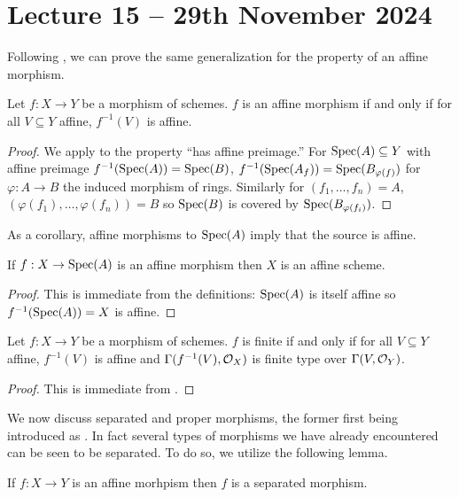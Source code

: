 \section{Lecture 15 -- 29th November 2024}\label{sec: lecture 15}
Following , we can prove the same generalization for the property of an affine morphism. 
\begin{proposition}\label{prop: affine communication for affine}
    Let $f:X\to Y$ be a morphism of schemes. $f$ is an affine morphism if and only if for all $V\subseteq Y$ affine, $f^{-1}(V)$ is affine. 
\end{proposition}
\begin{proof}
    We apply  to the property ``has affine preimage.'' For $\operatorname{Spec}(A)\subseteq Y$ with affine preimage $f^{-1}(\operatorname{Spec}(A))=\operatorname{Spec}(B)$, $f^{-1}(\operatorname{Spec}(A_{f}))=\operatorname{Spec}(B_{\varphi(f)})$ for $\varphi:A\to B$ the induced morphism of rings. Similarly for $(f_{1},\dots,f_{n})=A$, $(\varphi(f_{1}),\dots,\varphi(f_{n}))=B$ so $\operatorname{Spec}(B)$ is covered by $\operatorname{Spec}(B_{\varphi(f_{i})})$. 
\end{proof}
As a corollary, affine morphisms to $\operatorname{Spec}(A)$ imply that the source is affine. 
\begin{corollary}\label{corr: affine morphism to affine target is affine source}
    If $f:X\to \operatorname{Spec}(A)$ is an affine morphism then $X$ is an affine scheme.  
\end{corollary}
\begin{proof}
    This is immediate from the definitions: $\operatorname{Spec}(A)$ is itself affine so $f^{-1}(\operatorname{Spec}(A))=X$ is affine. 
\end{proof}
\begin{corollary}\label{corr: finite is affine and finite type}
    Let $f:X\to Y$ be a morphism of schemes. $f$ is finite if and only if for all $V\subseteq Y$ affine, $f^{-1}(V)$ is affine and $\Gamma(f^{-1}(V),\mathcal{O}_{X})$ is finite type over $\Gamma(V,\mathcal{O}_{Y})$. 
\end{corollary}
\begin{proof}
    This is immediate from . 
\end{proof}
We now discuss separated and proper morphisms, the former first being introduced as . In fact several types of morphisms we have already encountered can be seen to be separated. To do so, we utilize the following lemma. 
\begin{proposition}\label{prop: affine implies separated}
    If $f:X\to Y$ is an affine morhpism then $f$ is a separated morphism. 
\end{proposition}

